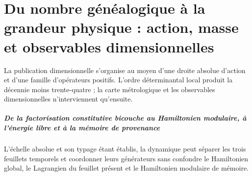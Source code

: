 \chapter{Du nombre généalogique à la grandeur physique : action, masse et observables dimensionnelles}
\label{chap:parte-iv-49}

La publication dimensionnelle s’organise au moyen d’une droite absolue d’action et d’une famille d’opérateurs positifs. L’ordre déterminantal local produit la décennie moins trente-quatre ; la carte métrologique et les observables dimensionnelles n’interviennent qu’ensuite.

\begin{HMTScientificOwnerSubordinated}

\end{HMTScientificOwnerSubordinated}

\begin{HMTScientificOwnerSubordinated}

\end{HMTScientificOwnerSubordinated}



\paragraph{De la factorisation constitutive bicouche au Hamiltonien modulaire, à l’énergie libre et à la mémoire de provenance} L’échelle absolue et son typage étant établis, la dynamique peut séparer les trois feuillets temporels et coordonner leurs générateurs sans confondre le Hamiltonien global, le Lagrangien du feuillet présent et le Hamiltonien modulaire de mémoire.
